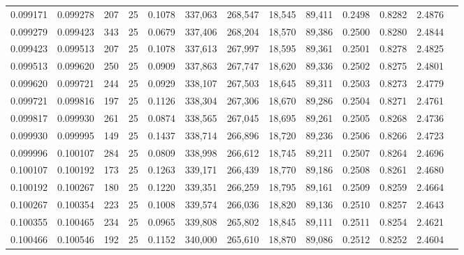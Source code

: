 \begin{tabular}{rrrrrrrrrrrrr}
0.099171 & 0.099278 &   207 &  25 &                                     0.1078 & 337,063 & 268,547 &  18,545 &  89,411 & 0.2498 & 0.8282 & 2.4876 \\
0.099279 & 0.099423 &   343 &  25 &                                     0.0679 & 337,406 & 268,204 &  18,570 &  89,386 & 0.2500 & 0.8280 & 2.4844 \\
0.099423 & 0.099513 &   207 &  25 &                                     0.1078 & 337,613 & 267,997 &  18,595 &  89,361 & 0.2501 & 0.8278 & 2.4825 \\
0.099513 & 0.099620 &   250 &  25 &                                     0.0909 & 337,863 & 267,747 &  18,620 &  89,336 & 0.2502 & 0.8275 & 2.4801 \\
0.099620 & 0.099721 &   244 &  25 &                                     0.0929 & 338,107 & 267,503 &  18,645 &  89,311 & 0.2503 & 0.8273 & 2.4779 \\
0.099721 & 0.099816 &   197 &  25 &                                     0.1126 & 338,304 & 267,306 &  18,670 &  89,286 & 0.2504 & 0.8271 & 2.4761 \\
0.099817 & 0.099930 &   261 &  25 &                                     0.0874 & 338,565 & 267,045 &  18,695 &  89,261 & 0.2505 & 0.8268 & 2.4736 \\
0.099930 & 0.099995 &   149 &  25 &                                     0.1437 & 338,714 & 266,896 &  18,720 &  89,236 & 0.2506 & 0.8266 & 2.4723 \\
0.099996 & 0.100107 &   284 &  25 &                                     0.0809 & 338,998 & 266,612 &  18,745 &  89,211 & 0.2507 & 0.8264 & 2.4696 \\
0.100107 & 0.100192 &   173 &  25 &                                     0.1263 & 339,171 & 266,439 &  18,770 &  89,186 & 0.2508 & 0.8261 & 2.4680 \\
0.100192 & 0.100267 &   180 &  25 &                                     0.1220 & 339,351 & 266,259 &  18,795 &  89,161 & 0.2509 & 0.8259 & 2.4664 \\
0.100267 & 0.100354 &   223 &  25 &                                     0.1008 & 339,574 & 266,036 &  18,820 &  89,136 & 0.2510 & 0.8257 & 2.4643 \\
0.100355 & 0.100465 &   234 &  25 &                                     0.0965 & 339,808 & 265,802 &  18,845 &  89,111 & 0.2511 & 0.8254 & 2.4621 \\
0.100466 & 0.100546 &   192 &  25 &                                     0.1152 & 340,000 & 265,610 &  18,870 &  89,086 & 0.2512 & 0.8252 & 2.4604 \\

\end{tabular}

